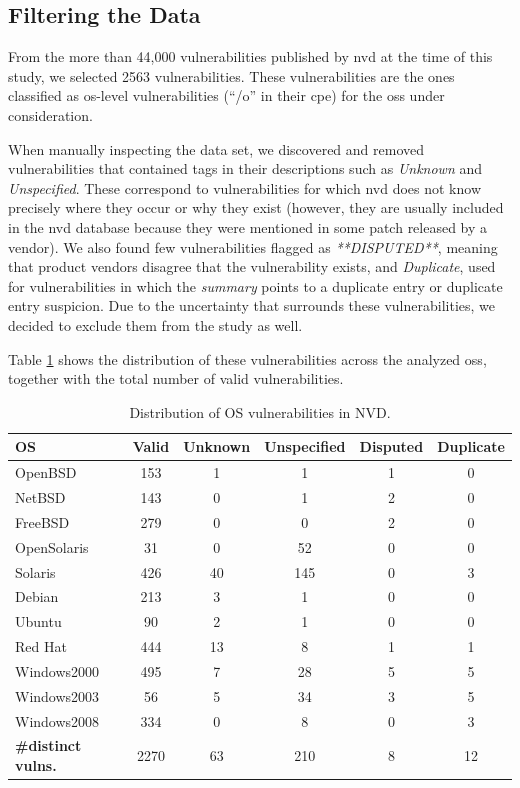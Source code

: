 \subsection{Filtering the Data}\label{filtering_data}


From the more than 44,000 vulnerabilities published by \gls{nvd} at the time of this study, we selected 2563 vulnerabilities.
These vulnerabilities are the ones classified as \gls{os}-level vulnerabilities (``/o'' in their \gls{cpe}) for the \glspl{os} under consideration.

When manually inspecting the data set, we discovered and removed vulnerabilities that contained tags in their descriptions such as \emph{Unknown} and \emph{Unspecified}. 
These correspond to vulnerabilities for which \gls{nvd} does not know precisely where they occur or why they exist (however, they are usually included in the \gls{nvd} database because they were mentioned in some patch released by a vendor). 
We also found few vulnerabilities flagged as \emph{**DISPUTED**}, meaning that product vendors disagree that the vulnerability exists, and \emph{Duplicate}, used for vulnerabilities in which the \emph{summary} points to a duplicate entry or duplicate entry suspicion.
Due to the uncertainty that surrounds these vulnerabilities, we decided to exclude them from the study as well.

Table \ref{tab:unknowns} shows the distribution of these vulnerabilities across the analyzed \glspl{os}, together with the total number of valid vulnerabilities.

\begin{table}[!ht]
\begin{center}
{\scriptsize
\begin{tabular}{|l||c | c | c | c | c|}\hline
\textbf{OS} & \textbf{Valid} & \textbf{Unknown} & \textbf{Unspecified} & \textbf{Disputed} & \textbf{Duplicate}  \\\hline\hline %
OpenBSD & 153 & 1 & 1 & 1 & 0 \\
NetBSD & 143 & 0 & 1 & 2 & 0  \\
FreeBSD & 279 & 0 & 0 & 2 & 0 \\
OpenSolaris & 31 & 0 & 52 & 0 & 0  \\
Solaris & 426 & 40 & 145 & 0 & 3  \\
Debian & 213 & 3 & 1 & 0 & 0  \\
Ubuntu & 90 & 2 & 1 & 0 & 0  \\
Red Hat & 444 & 13 & 8 & 1 & 1  \\
Windows2000 & 495 & 7 & 28 & 5 & 5  \\
Windows2003 & 56 & 5 & 34 & 3 & 5  \\
Windows2008 & 334 & 0 & 8 & 0 & 3   \\\hline\hline
\textbf{\#distinct vulns.} & 2270 & 63 & 210 & 8 & 12 \\ \hline
\end{tabular}
\caption{Distribution of OS vulnerabilities in NVD.}
\label{tab:unknowns}
}
\end{center}
\end{table}

